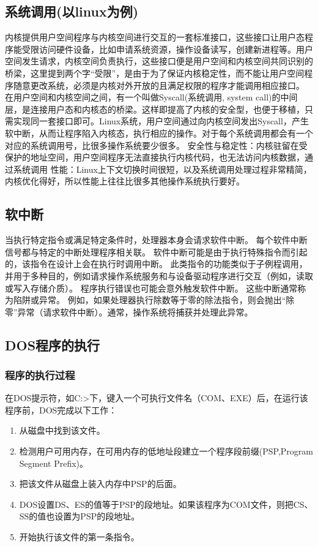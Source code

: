 \documentclass[a4paper, 11pt]{article} %
\begin{document}
\subsection{系统调用(以linux为例)}
内核提供用户空间程序与内核空间进行交互的一套标准接口，这些接口让用户态程序能受限访问硬件设备，比如申请系统资源，操作设备读写，创建新进程等。用户空间发生请求，内核空间负责执行，这些接口便是用户空间和内核空间共同识别的桥梁，这里提到两个字“受限”，是由于为了保证内核稳定性，而不能让用户空间程序随意更改系统，必须是内核对外开放的且满足权限的程序才能调用相应接口。
在用户空间和内核空间之间，有一个叫做Syscall(系统调用, system call)的中间层，是连接用户态和内核态的桥梁。这样即提高了内核的安全型，也便于移植，只需实现同一套接口即可。Linux系统，用户空间通过向内核空间发出Syscall，产生软中断，从而让程序陷入内核态，执行相应的操作。对于每个系统调用都会有一个对应的系统调用号，比很多操作系统要少很多。
安全性与稳定性：内核驻留在受保护的地址空间，用户空间程序无法直接执行内核代码，也无法访问内核数据，通过系统调用
性能：Linux上下文切换时间很短，以及系统调用处理过程非常精简，内核优化得好，所以性能上往往比很多其他操作系统执行要好。\cite{gityuan2016}

\subsection{软中断}
当执行特定指令或满足特定条件时，处理器本身会请求软件中断。 每个软件中断信号都与特定的中断处理程序相关联。
软件中断可能是由于执行特殊指令而引起的，该指令在设计上会在执行时调用中断。 此类指令的功能类似于子例程调用，并用于多种目的，例如请求操作系统服务和与设备驱动程序进行交互（例如，读取或写入存储介质）。
程序执行错误也可能会意外触发软件中断。 这些中断通常称为陷阱或异常。 例如，如果处理器执行除数等于零的除法指令，则会抛出“除零”异常（请求软件中断）。通常，操作系统将捕获并处理此异常。\cite{wiki:Interrupt}

\subsection{DOS程序的执行} 

\subsubsection{程序的执行过程} 
在DOS提示符，如C:>下，键入一个可执行文件名（COM、EXE）后，在运行该程序前，DOS完成以下工作： \cite{csdn2010}
\begin{enumerate}
  \item 从磁盘中找到该文件。 
  \item 检测用户可用内存，在可用内存的低地址段建立一个程序段前缀(PSP,Program Segment Prefix)。 
  \item 把该文件从磁盘上装入内存中PSP的后面。 
  \item DOS设置DS、ES的值等于PSP的段地址。如果该程序为COM文件，则把CS、SS的值也设置为PSP的段地址。
  \item 开始执行该文件的第一条指令。
\end{enumerate}
\end{document}
